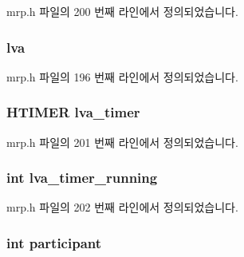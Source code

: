 mrp.\+h 파일의 200 번째 라인에서 정의되었습니다.

\subsubsection[{\texorpdfstring{lva}{lva}}]{ lva}\hypertarget{structmrp__database_aefeb3936cf0a8963a3e1646e35b291e9}{}\label{structmrp__database_aefeb3936cf0a8963a3e1646e35b291e9}


mrp.\+h 파일의 196 번째 라인에서 정의되었습니다.

\subsubsection[{\texorpdfstring{lva\+\_\+timer}{lva_timer}}]{\setlength{\rightskip}{0pt plus 5cm}H\+T\+I\+M\+ER lva\+\_\+timer}\hypertarget{structmrp__database_a63013eac35405517020e4681a260d06d}{}\label{structmrp__database_a63013eac35405517020e4681a260d06d}


mrp.\+h 파일의 201 번째 라인에서 정의되었습니다.

\subsubsection[{\texorpdfstring{lva\+\_\+timer\+\_\+running}{lva_timer_running}}]{\setlength{\rightskip}{0pt plus 5cm}int lva\+\_\+timer\+\_\+running}\hypertarget{structmrp__database_a80208a6b8c69dfec5b433adb2edfd471}{}\label{structmrp__database_a80208a6b8c69dfec5b433adb2edfd471}


mrp.\+h 파일의 202 번째 라인에서 정의되었습니다.

\subsubsection[{\texorpdfstring{participant}{participant}}]{\setlength{\rightskip}{0pt plus 5cm}int participant}\hypertarget{structmrp__database_a08ed403eabc8682a01da8a737ac32c31}{}\label{structmrp__database_a08ed403eabc8682a01da8a737ac32c31}


